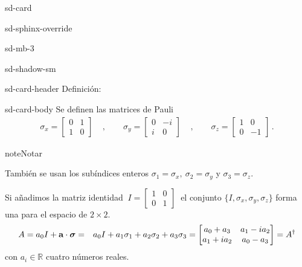 \documentclass[letterpaper,10pt,english]{jupyterBook}
\begin{document}
\begin{sphinxuseclass}{sd-card}
\begin{sphinxuseclass}{sd-sphinx-override}
\begin{sphinxuseclass}{sd-mb-3}
\begin{sphinxuseclass}{sd-shadow-sm}
\begin{sphinxuseclass}{sd-card-header}
\sphinxAtStartPar
Definición:

\end{sphinxuseclass}
\begin{sphinxuseclass}{sd-card-body}
\sphinxAtStartPar
Se definen las matrices de Pauli
\begin{equation*}
\begin{split}
\sigma_x = \begin{bmatrix} 0 & 1 \\ 1 & 0 \end{bmatrix}~~~~~,~~~~~~~~~
\sigma_y = \begin{bmatrix} 0 & -i \\ i & 0 \end{bmatrix}~~~~~,~~~~~~~~~
\sigma_z = \begin{bmatrix} 1 & 0 \\ 0 & -1 \end{bmatrix} \, .
\end{split}
\end{equation*}
\end{sphinxuseclass}
\end{sphinxuseclass}
\end{sphinxuseclass}
\end{sphinxuseclass}
\end{sphinxuseclass}
\begin{sphinxadmonition}{note}{Notar}

\sphinxAtStartPar
También se usan los subíndices enteros \(\sigma_1=\sigma_x, ~
\sigma_2=\sigma_y\)  y  \(\sigma_3=\sigma_z\).
\end{sphinxadmonition}

\sphinxAtStartPar
Si añadimos la matriz identidad \(~I = \begin{bmatrix} 1 & 0 \\ 0 & 1 \end{bmatrix}~
\)  el conjunto \(\{I,\sigma_x,\sigma_y,\sigma_z\}\) forma una  para el espacio de  \(2\times 2\).
\begin{eqnarray*}
A = a_0 I + {\bf a} \cdot \boldsymbol{\sigma}  &=&   a_0 I + a_1 \sigma_1 + a_2 \sigma_2 + a_3 \sigma_3  = 
\begin{bmatrix}
a_0 + a_3 & a_1 - i a_2 \\ a_1 + i a_2 & a_0 - a_3
\end{bmatrix} = A^\dagger
\end{eqnarray*}
\sphinxAtStartPar
con \(a_i\in {\mathbb R}\) cuatro números reales.
\end{document}
